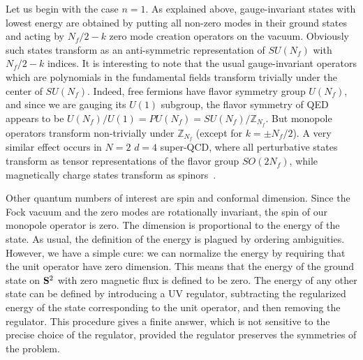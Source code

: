 \documentclass[a4paper,12pt, amsfonts, amssymb]{article}
\newcommand{\ZZ}{{\mathbb Z}}
\begin{document}
Let us begin with the case $n=1$.
As explained above, gauge-invariant states with lowest energy are obtained 
by putting all non-zero modes in their ground states and acting by $N_f/2-k$ 
zero mode creation operators on the vacuum. Obviously such states
transform as an anti-symmetric representation of $SU(N_f)$ with
$N_f/2-k$ indices. It is interesting to note that the usual 
gauge-invariant operators which are polynomials in the fundamental
fields transform trivially under the center of $SU(N_f)$. Indeed,
free fermions have flavor symmetry group $U(N_f)$, and since
we are gauging its $U(1)$ subgroup, the flavor symmetry of QED appears to be
$U(N_f)/U(1)=PU(N_f)=SU(N_f)/\ZZ_{N_f}$. But monopole operators
transform non-trivially under $\ZZ_{N_f}$ (except for $k=\pm N_f/2$).
A very similar effect occurs in $N=2$ $d=4$ super-QCD, where all perturbative
states transform as tensor representations of the flavor group $SO(2N_f)$,
while magnetically charge states transform as spinors~\cite{SW2}.

Other quantum numbers of interest are spin and conformal dimension.
Since the Fock vacuum and the zero modes are rotationally invariant,
the spin of our monopole operator is zero. The dimension is proportional
to the energy of the state. As usual, the definition of the energy
is plagued by ordering ambiguities. However, we have a simple cure:
we can normalize the energy by requiring that the unit operator
have zero dimension. This means that the energy of the ground state
on ${\bf S}^2$ with zero magnetic flux is defined to be zero. 
The energy of any other state can be defined by introducing a UV
regulator, subtracting the regularized energy of the state corresponding
to the unit operator, and then removing the regulator. This procedure gives
a finite answer, which is not sensitive to the precise choice of the
regulator, provided the regulator preserves the symmetries of the
problem. 
\end{document}
